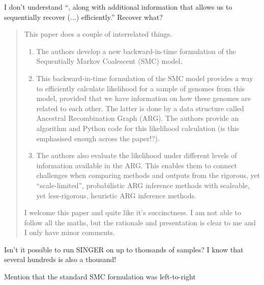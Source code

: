 \reply{
}

\begin{point}{\revref} %
 I don't understand ``, along with additional information that allows us to sequentially recover (...) efficiently.'' Recover what?
\end{point}




\begin{quote}
This paper does a couple of interrelated things.
\begin{enumerate}
    \item The authors develop a new backward-in-time formulation of the Sequentially Markov Coalescent (SMC) model.
    \item This backward-in-time formulation of the SMC model provides a way to efficiently calculate likelihood for a sample of genomes from this model, provided that we have information on how these genomes are related to each other. The latter is done by a data structure called Ancestral Recombination Graph (ARG). The authors provide an algorithm and Python code for this likelihood calculation (is this emphasised enough across the paper!?).
    \item The authors also evaluate the likelihood under different levels of information available in the ARG. This enables them to connect challenges when comparing methods and outputs from the rigorous, yet ``scale-limited'', probabilistic ARG inference methods with scaleable, yet less-rigorous, heuristic ARG inference methods.
\end{enumerate}
I welcome this paper and quite like it's succinctness. I am not able to follow all the maths, but the rationale and presentation is clear to me and I only have minor comments.
\end{quote}


\begin{point}{\revref} %
 Isn't it possible to run SINGER on up to thousands of samples? I know that several hundreds is also a thousand!
\end{point}

\reply{
}


\begin{point}{}
Mention that the standard SMC formulation was left-to-right
\end{point}


